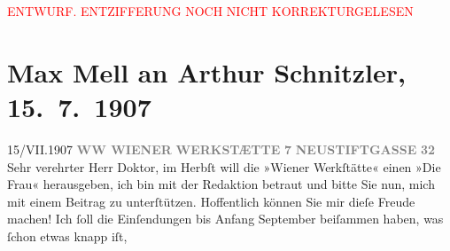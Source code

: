 
\begin{center}
            \textcolor{red}{ENTWURF. ENTZIFFERUNG NOCH NICHT KORREKTURGELESEN}
                      \end{center}
            
               \section[Max Mell an Arthur Schnitzler, 15. 7. 1907]{ Max Mell an Arthur Schnitzler, 15. 7. 1907}\nopagebreak{}\rehead{ }\begin{ledgroupsized}[t]{13cm}\normalsize\beginnumbering{} \toendnotes[C]{\smallbreak\pagebreak[2]} 
\toendnotes[C]{\smallbreak}\pstart
           \noindent{}{\pb}15/VII.\hfill 1907\pend
           \pstart
           \centering{}\textcolor{gray}{\textbf{WW WIENER}}\pend
           \pstart
           \noindent{}\centering{}\textcolor{gray}{\textbf{WERKSTÆTTE}}\pend
           \pstart
           \noindent{}\centering{}\textcolor{gray}{\textbf{7}}\pend
           \pstart
           \noindent{}\centering{}\textcolor{gray}{\textbf{NEUSTIFTGASSE}}\pend
           \pstart
           \noindent{}\centering{}\textcolor{gray}{\textbf{32}}\pend
           \pstart{}Sehr verehrter Herr Doktor,\pend\pstart
           im Herbſt will die »Wiener Werkſtätte« einen
                        \label{K_L01692_1v}\label{K_L01692_1h} »Die Frau« herausgeben, ich
                    bin mit der Redaktion betraut und bitte Sie nun, mich mit einem Beitrag zu
                    unterſtützen. Hoffentlich können Sie mir dieſe Freude machen! Ich ſoll die
                    Einſendungen bis Anfang September beiſammen haben, was ſchon etwas knapp iſt,

\end{ledgroupsized}
